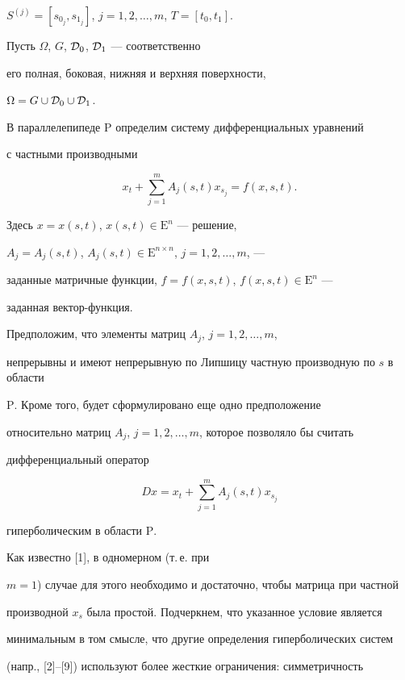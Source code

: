 $S^{(j)} = [s_{0_j}, s_{1_j}]$, $j=1,2,\dotsc,m$, $T = [t_0,t_1]$.


Пусть $\Omega$, $G$, ${\cal D}_0$, ${\cal D}_1$ --- соответственно


его полная, боковая, нижняя и верхняя поверхности,


$\Omega = G \cup {\cal D}_0 \cup {\cal D}_1$.


В параллелепипеде $\mathrm P$ определим систему дифференциальных уравнений


с частными производными


\begin{equation}


x_t+\sum_{j=1}^{m} A_{j}(s,t)x_{s_j} = f(x,s,t).


\end{equation}


Здесь $x=x(s,t)$, $x(s,t) \in {\mathrm E}^n$ --- решение, 


$A_j=A_j(s,t)$, $A_j(s,t)\in{\mathrm E}^{n\times n}$, $j=1,2,\dotsc,m$, ---


заданные матричные функции, $f=f(x,s,t)$, $f(x,s,t) \in {\mathrm E}^n$ ---


заданная вектор-функция.


Предположим, что элементы матриц $A_j$, $j=1,2,\dotsc,m$, 


непрерывны и имеют непрерывную по Липшицу частную производную по $s$ в области 


$\mathrm P$. Кроме того, будет сформулировано еще одно предположение 


относительно матриц $A_j$, $j=1,2,\dotsc,m$, которое позволяло бы считать 


дифференциальный оператор


\begin{equation}


Dx=x_t+\sum_{j=1}^{m} A_{j}(s,t)x_{s_j}


\end{equation}


гиперболическим в области $\mathrm P$.


Как известно [1], в одномерном (т.\,е. при


$m=1$) случае для этого необходимо и достаточно, чтобы матрица при частной 


производной $x_s$ была простой. Подчеркнем, что указанное условие является


минимальным в том смысле, что другие определения гиперболических систем 


(напр., [2]--[9]) используют более жесткие ограничения: симметричность 


